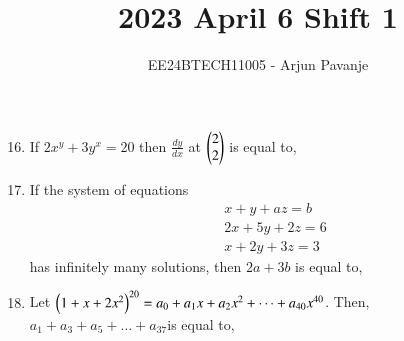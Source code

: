 \documentclass[journal]{IEEEtran}
\begin{document}

\vspace{3cm}
	
\title{2023 April 6 Shift 1}
\author{EE24BTECH11005 - Arjun Pavanje}
{\let\newpage\relax\maketitle}
\begin{enumerate}
	\setcounter{enumi}{15}
\item If $2x^y+3y^x=20$ then $\frac{dy}{dx}$ at $\begin{pmatrix}2\\2\end{pmatrix}$ is equal to,
		\begin{enumerate}
		\end{enumerate}
	\item If the system of equations
		\begin{align*}
			&x+y+az=b\\
			&2x+5y+2z=6\\
			&x+2y+3z=3
		\end{align*}
		has infinitely many solutions, then $2a+3b$ is equal to, 
		\begin{enumerate}
				\begin{multicols}{2}
					\item $28$
				\columnbreak
					\item $20$
				\end{multicols}
				\begin{multicols}{2}
					\item $25$
				\columnbreak
					\item $23$
				\end{multicols}
		\end{enumerate}
	\item Let $\left(1+x+2x^2\right)^{20}=a_0+a_1x+a_2x^2+\dots+a_{40}x^{40}$. Then, $a_1+a_3+a_5+\dots+a_{37}$is equal to,

\end{enumerate}
\end{document}
